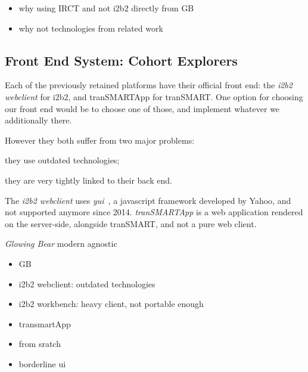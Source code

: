 






\begin{itemize}
    \item why using IRCT and not i2b2 directly from GB
    \item why not technologies from related work
\end{itemize}






\subsection{Front End System: Cohort Explorers}

Each of the previously retained platforms have their official front end: the \emph{i2b2 webclient} for i2b2, and {tranSMARTApp} for tranSMART.
One option for choosing our front end would be to choose one of those, and implement whatever we additionally there.

However they both suffer from two major problems:
\begin{enumerate*}
    \item they use outdated technologies;
    \item they are very tightly linked to their back end.
\end{enumerate*}
The \emph{i2b2 webclient} uses \emph{yui}~\cite{todo}, a javascript framework developed by Yahoo, and not supported anymore since 2014. 
\emph{tranSMARTApp} is a web application rendered on the server-side, alongside tranSMART, and not a pure web client.

\emph{Glowing Bear} 
modern
agnostic


\begin{itemize}
    \item GB
    \item i2b2 webclient: outdated technologies
    \item i2b2 workbench: heavy client, not portable enough
    \item transmartApp 
    \item from sratch
    \item borderline ui
\end{itemize}

